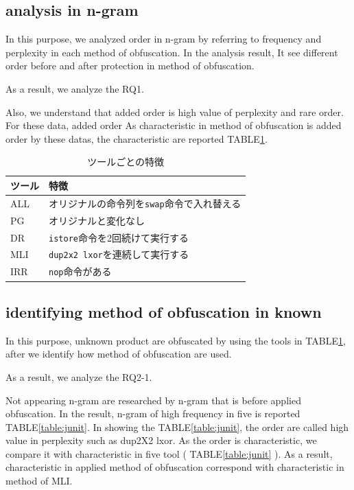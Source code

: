 \documentclass[conference]{IEEEtran}
\begin{document}
\subsection{analysis in n-gram}
In this purpose, we analyzed order in n-gram by referring to frequency and perplexity in each method of obfuscation.
In the analysis result, It see different order before and after protection in method of obfuscation.

As a result, we analyze the RQ1.

Also, we understand that added order is high value of perplexity and rare order.
For these data, added order
As characteristic in method of obfuscation is added order by these datas, the characteristic are reported TABLE\ref{table:features}.



\begin{table}[t]
  \centering
  \footnotesize{
    \caption{ツールごとの特徴}\label{table:features}
  \begin{tabular}{l|l}
    ツール              & 特徴　\\ \hline
    ALL & オリジナルの命令列を\texttt{swap}命令で入れ替える \\
    PG  & オリジナルと変化なし \\
    DR  & \texttt{istore}命令を2回続けて実行する \\
    MLI & \texttt{dup2x2 lxor}を連続して実行する \\
    IRR & \texttt{nop}命令がある \\
  \end{tabular}}
\end{table}


\subsection{identifying method of obfuscation in known}
In this purpose, unknown product are obfuscated by using the tools in TABLE\ref{table:features}, after we identify how method of obfuscation are used.

As a result, we analyze the RQ2-1.

Not appearing n-gram are researched by n-gram that is before applied obfuscation.
In the result, n-gram of high frequency in five is reported TABLE\ref{table:junit}.
In showing the TABLE\ref{table:junit}, the order are called high value in perplexity such as dup2X2 lxor.
As the order is characteristic, we compare it with characteristic in five tool ( TABLE\ref{table:junit} ).
As a result, characteristic in applied method of obfuscation correspond with characteristic in method of MLI.
\end{document}
